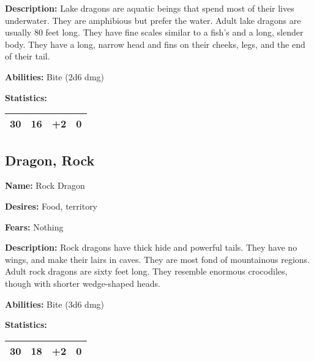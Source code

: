 \begin{multicols}{2}
\textbf{Description:} Lake dragons are aquatic beings that spend most of their lives underwater.
They are amphibious but prefer the water. Adult lake dragons are usually 80 feet long. They have
fine scales similar to a fish's and a long, slender body. They have a long, narrow head and fins on
their cheeks, legs, and the end of their tail.

\textbf{Abilities:} Bite (2d6 dmg)

\textbf{Statistics:}

\begin{center}
{
\begin{xtabular}{|l|l|l|l|}
30 & 16 & +2 & 0 \\
\hline
\end{xtabular}
}
\end{center}

\subsection{Dragon, Rock}

\textbf{Name:} Rock Dragon

\textbf{Desires:} Food, territory

\textbf{Fears:} Nothing

\textbf{Description:} Rock dragons have thick hide and powerful tails. They have no
wings, and make their lairs in caves. They are most fond of mountainous regions. Adult
rock dragons are sixty feet long. They resemble enormous crocodiles, though with shorter
wedge-shaped heads.

\textbf{Abilities:} Bite (3d6 dmg)

\textbf{Statistics:}

\begin{center}
{
\begin{xtabular}{|l|l|l|l|}
30 & 18 & +2 & 0 \\
\hline
\end{xtabular}
}
\end{center}


\end{multicols}
